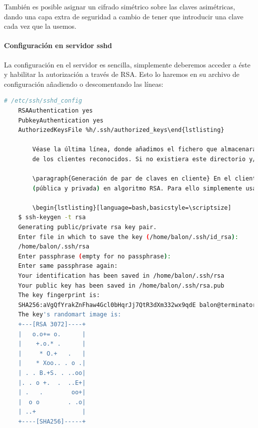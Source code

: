 \documentclass[a4paper, 11pt, titlepage]{article}
\begin{document}
        También es posible asignar un cifrado simétrico sobre las claves asimétricas, dando una 
        capa extra de seguridad a cambio de tener que introducir una clave cada vez que la usemos.
        
        \paragraph{Configuración en servidor sshd} La configuración en el servidor es sencilla,
        simplemente deberemos acceder a éste y habilitar la autorización a través de RSA. Esto lo haremos 
        en su archivo de configuración añadiendo o descomentando las líneas:

        \begin{lstlisting}[language=bash]
    # /etc/ssh/sshd_config
    RSAAuthentication yes
    PubkeyAuthentication yes
    AuthorizedKeysFile %h/.ssh/authorized_keys\end{lstlisting}

        Véase la última línea, donde añadimos el fichero que almacenará las claves públicas 
        de los clientes reconocidos. Si no existiera este directorio y/o fichero deberemos crearlo.

        \paragraph{Generación de par de claves en cliente} En el cliente crearemos el par de claves 
        (pública y privada) en algoritmo RSA. Para ello simplemente usaremos 

        \begin{lstlisting}[language=bash,basicstyle=\scriptsize]
    $ ssh-keygen -t rsa
    Generating public/private rsa key pair.
    Enter file in which to save the key (/home/balon/.ssh/id_rsa): 
    /home/balon/.ssh/rsa
    Enter passphrase (empty for no passphrase): 
    Enter same passphrase again: 
    Your identification has been saved in /home/balon/.ssh/rsa
    Your public key has been saved in /home/balon/.ssh/rsa.pub
    The key fingerprint is:
    SHA256:aVgQfYrakZnFhaw4Gcl0bHqrJj7QtR3dXm332wx9qdE balon@terminator
    The key's randomart image is:
    +---[RSA 3072]----+
    |   o.o+= o.      |
    |    +.o.* .      |
    |     * O.+   .   |
    |    * Xoo.. . o .|
    | . . B.+S. . ..oo|
    |. . o +.  .  ..E+|
    | .   .        oo+|
    |  o o        . .o|
    | ..+             |
    +----[SHA256]-----+\end{lstlisting}
\end{document}
